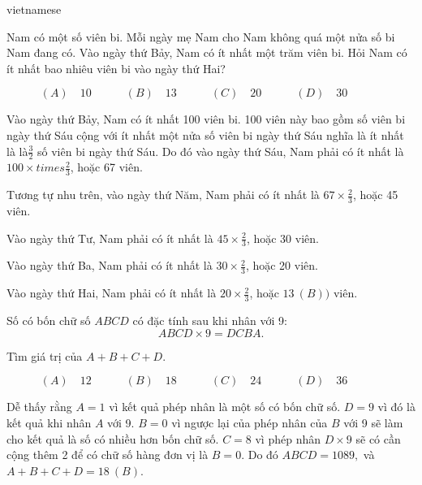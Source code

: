\documentclass{article}
\begin{document}
\begin{otherlanguage*}{vietnamese}
\newpage

\begin{problem*}[PI-2024-C-P21]
    \label{problem:pi-2024-c-p21}

    Nam có một số viên bi. Mỗi ngày mẹ Nam cho Nam không quá một nửa số bi Nam đang có.
    Vào ngày thứ Bảy, Nam có ít nhất một trăm viên bi. Hỏi Nam có ít nhất bao nhiêu viên bi vào ngày thứ Hai?

    \[
        (A) \quad 10 \qquad \quad
        (B) \quad 13 \qquad \quad
        (C) \quad 20 \qquad \quad
        (D) \quad 30 \qquad \quad
    \]
\end{problem*}

\begin{soln}
    Vào ngày thứ Bảy, Nam có ít nhất 100 viên bi.
    100 viên này bao gồm số viên bi ngày thứ Sáu cộng với ít nhất một nửa số viên bi ngày thứ Sáu nghĩa là ít nhất là là$\frac{3}{2}$ số viên bi ngày thứ Sáu.
    Do đó vào ngày thứ Sáu, Nam phải có ít nhất là $100 \times times\frac{2}{3}$, hoặc 67 viên.

    Tương tự nhu trên, vào ngày thứ Năm, Nam phải có ít nhất là $67 \times \frac{2}{3}$, hoặc 45 viên.

    Vào ngày thứ Tư, Nam phải có ít nhất là $45 \times \frac{2}{3}$, hoặc 30 viên.

    Vào ngày thứ Ba, Nam phải có ít nhất là $30 \times \frac{2}{3}$, hoặc 20 viên.
    
    Vào ngày thứ Hai, Nam phải có ít nhất là $20 \times \frac{2}{3}$, hoặc $\boxed{13\ (B))}$ viên.
\end{soln}

\bigbreak

\begin{problem*}[PI-2024-C-P22]
    \label{problem:pi-2024-c-p22}

    Số có bốn chữ số $ABCD$ có đặc tính sau khi nhân với 9:
    \[
        ABCD \times 9 = DCBA.
    \]

    Tìm giá trị của $A+B+C+D.$

    \[
        (A) \quad 12 \qquad \quad
        (B) \quad 18 \qquad \quad
        (C) \quad 24 \qquad \quad
        (D) \quad 36 \qquad \quad
    \]
\end{problem*}

\begin{soln}
    Dễ thấy rằng $A=1$ vì kết quả phép nhân là một số có bốn chữ số.
    $D = 9$ vì đó là kết quả khi nhân $A$ với 9.
    $B = 0$ vì ngược lại của phép nhân của $B$ với 9 sẽ làm cho kết quả là số có nhiều hơn bốn chữ số.
    $C = 8$ vì phép nhân $D \times 9$ sẽ có cần cộng thêm 2 để có chữ số hàng đơn vị là $B = 0.$
    Do đó $ABCD = 1089,$ và $A+B+C+D = \boxed{18\ (B).}$
\end{soln}


\end{otherlanguage*}
\end{document}
